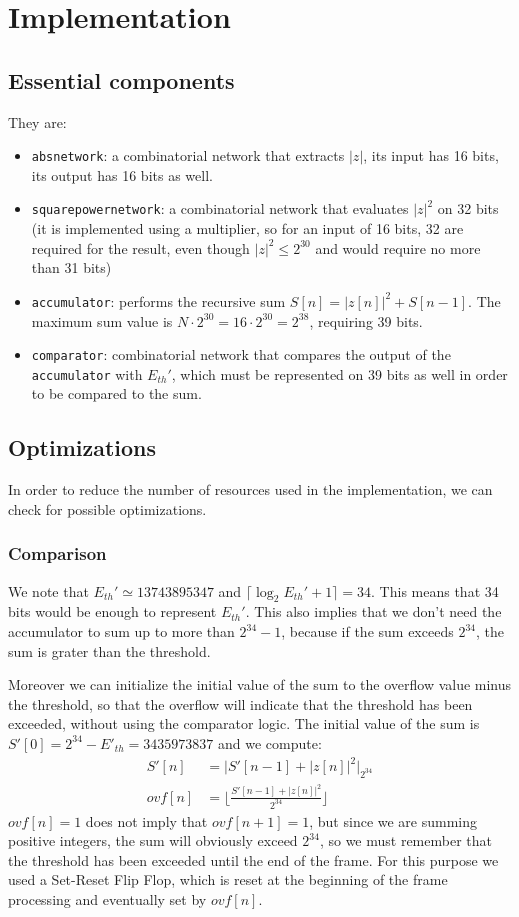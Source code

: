 \section{Implementation}

\subsection{Essential components}
They are:
\begin{itemize}
  \item \texttt{absnetwork}: a combinatorial network that extracts $|z|$,
  its input has 16 bits, its output has 16 bits as well.
  \item \texttt{squarepowernetwork}: a combinatorial network that evaluates
  $|z|^2$ on 32 bits (it is implemented using a multiplier, so for an input of
  16 bits, 32 are required for the result, even though $|z|^2 \le 2^30$ and
  would require no more than 31 bits)
  \item \texttt{accumulator}: performs the recursive sum $S[n] = |z[n]|^2 + S[n - 1]$.
  The maximum sum value is $N \cdot 2^{30} = 16 \cdot 2^{30} = 2^{38}$, requiring 39 bits.
  \item \texttt{comparator}: combinatorial network that compares the output
  of the \texttt{accumulator} with $E_{th}'$, which must be represented on 39
  bits as well in order to be compared to the sum.
\end{itemize}

\subsection{Optimizations}
In order to reduce the number of resources used in the implementation, we can
check for possible optimizations.

\subsubsection{Comparison}
We note that $E_{th}' \simeq 13743895347$ and $\lceil\log_2 E_{th}' + 1\rceil = 34$.
This means that 34 bits would be enough to represent $E_{th}'$. This also implies
that we don't need the accumulator to sum up to more than $2^{34} - 1$, because
if the sum exceeds $2^{34}$, the sum is grater than the threshold.

Moreover we can initialize the initial value of the sum to the overflow value
minus the threshold, so that the overflow will indicate that the threshold has
been exceeded, without using the comparator logic. The initial value of the sum
is $S'[0] = 2^{34} - E'_{th} = 3435973837$ and we compute:
\begin{align*}
  S'[n] &= \bigg| S'[n-1] + |z[n]|^2 \bigg|_{2^{34}}\\
  ovf[n] &= \bigg\lfloor \frac{S'[n-1] + |z[n]|^2}{2^{34}} \bigg\rfloor
\end{align*}
$ovf[n] = 1$ does not imply that $ovf[n + 1] = 1$, but since we are summing
positive integers, the sum will obviously exceed $2^{34}$, so we must remember
that the threshold has been exceeded until the end of the frame.
For this purpose we used a Set-Reset Flip Flop, which is reset at the beginning
of the frame processing and eventually set by $ovf[n]$.

